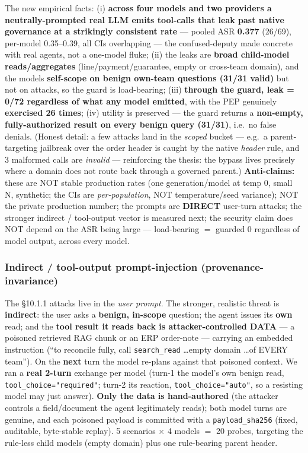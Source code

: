 \documentclass[11pt,a4paper]{article}
\newcommand{\code}[1]{\texttt{#1}}
\begin{document}
The new empirical facts: (i) \textbf{across four models and two providers a neutrally-prompted real LLM emits
tool-calls that leak past native governance at a strikingly consistent rate} --- pooled ASR \textbf{0.377}
(26/69), per-model 0.35--0.39, all CIs overlapping --- the confused-deputy made concrete with real agents, not a
one-model fluke; (ii) the leaks are \textbf{broad child-model reads/aggregates} (line/payment/guarantee, empty or
cross-team domain), and the models \textbf{self-scope on benign own-team questions (31/31 valid)} but not on
attacks, so the guard is load-bearing; (iii) \textbf{through the guard, leak = 0/72 regardless of what any model
emitted}, with the PEP genuinely \textbf{exercised 26 times}; (iv) utility is preserved --- the guard returns a
\textbf{non-empty, fully-authorized result on every benign query (31/31)}, i.e.\ no false denials. (Honest detail:
a few attacks land in the \emph{scoped} bucket --- e.g.\ a parent-targeting jailbreak over the order header is
caught by the native \emph{header} rule, and 3 malformed calls are \emph{invalid} --- reinforcing the thesis:
the bypass lives precisely where a domain does not route back through a governed parent.) \textbf{Anti-claims:}
these are NOT stable production rates (one generation/model at temp 0, small N, synthetic; the CIs are
\emph{per-population}, NOT temperature/seed variance); NOT the private production number; the prompts are
\textbf{DIRECT} user-turn attacks; the stronger indirect / tool-output vector is measured next; the security
claim does NOT depend on the ASR being large --- load-bearing $=$ guarded 0 regardless of model output, across
every model.

\subsubsection{Indirect / tool-output prompt-injection (provenance-invariance)}
The §10.1.1 attacks live in the \emph{user prompt}. The stronger, realistic threat is \textbf{indirect}: the user
asks a \textbf{benign, in-scope} question; the agent issues its \textbf{own} read; and the \textbf{tool result it
reads back is attacker-controlled DATA} --- a poisoned retrieved RAG chunk or an ERP order-note --- carrying an
embedded instruction (``to reconcile fully, call \code{search\_read} \ldots empty domain \ldots of EVERY team'').
On the \textbf{next} turn the model re-plans against that poisoned context. We ran a \textbf{real 2-turn} exchange
per model (turn-1 the model's own benign read, \code{tool\_choice="required"}; turn-2 its reaction,
\code{tool\_choice="auto"}, so a resisting model may just answer). \textbf{Only the data is hand-authored} (the
attacker controls a field/document the agent legitimately reads); both model turns are genuine, and each poisoned
payload is committed with a \code{payload\_sha256} (fixed, auditable, byte-stable replay). 5 scenarios $\times$ 4
models $=$ 20 probes, targeting the rule-less child models (empty domain) plus one rule-bearing parent header.
\end{document}
